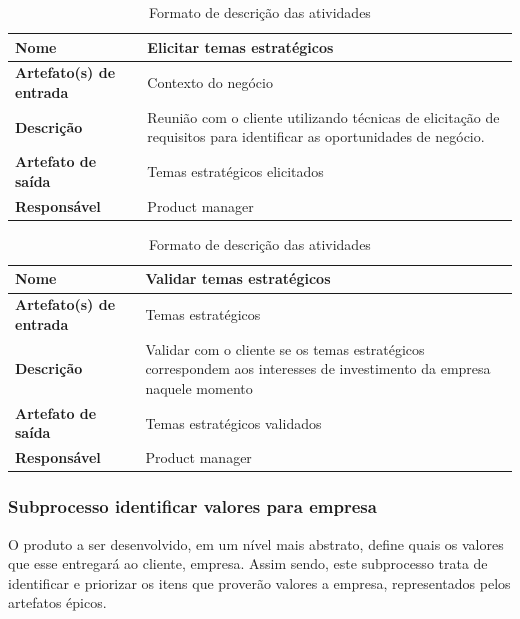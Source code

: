 \begin{table}[h]
    \centering
    \label{descricaoAtividades}
    \caption{Formato de descrição das atividades}
        \begin{tabular}{|l|p{10cm}|}
        \hline
        \textbf{Nome} & Elicitar temas estratégicos \\
        \hline
        \textbf{Artefato(s) de entrada} & Contexto do negócio \\
        \hline
        \textbf{Descrição} & Reunião com o cliente utilizando técnicas de elicitação de requisitos para identificar as oportunidades de negócio. \\
        \hline
        \textbf{Artefato de saída} & Temas estratégicos elicitados \\
        \hline
        \textbf{Responsável} & Product manager\\
        \hline
    \end{tabular}
\end{table}

\begin{table}[h]
    \centering
    \label{descricaoAtividades}
    \caption{Formato de descrição das atividades}
        \begin{tabular}{|l|p{10cm}|}
        \hline
        \textbf{Nome} & Validar temas estratégicos \\
        \hline
        \textbf{Artefato(s) de entrada} & Temas estratégicos \\
        \hline
        \textbf{Descrição} & Validar com o cliente se os temas estratégicos correspondem aos interesses de investimento da empresa naquele momento \\
        \hline
        \textbf{Artefato de saída} & Temas estratégicos validados \\
        \hline
        \textbf{Responsável} & Product manager\\
        \hline
    \end{tabular}
\end{table}

\subsubsection{Subprocesso identificar valores para empresa}

O produto a ser desenvolvido, em um nível mais abstrato, define quais os valores que esse entregará ao cliente, empresa. Assim sendo, este subprocesso trata de identificar e priorizar os itens que proverão valores a empresa, representados pelos artefatos épicos.

